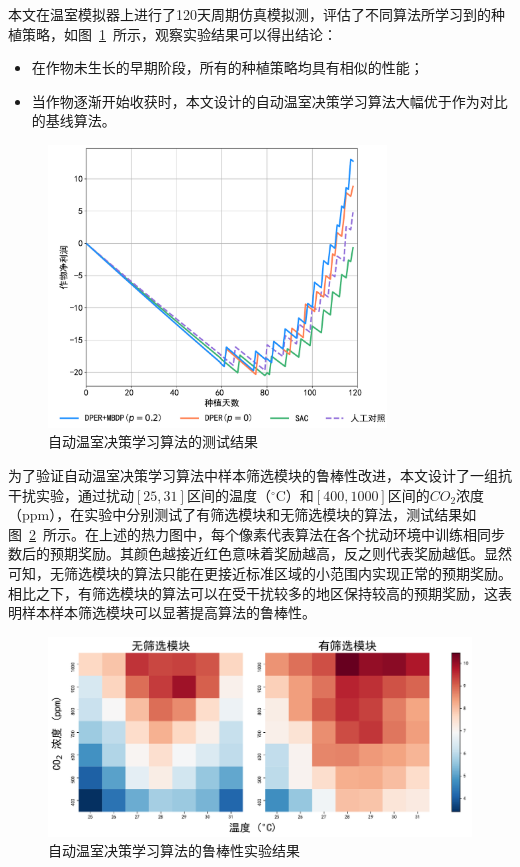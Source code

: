本文在温室模拟器上进行了120天周期仿真模拟测，评估了不同算法所学习到的种植策略，如图~\ref{fig:acml-test}~所示，观察实验结果可以得出结论：

\begin{itemize}
    \item 在作物未生长的早期阶段，所有的种植策略均具有相似的性能；
    \item 当作物逐渐开始收获时，本文设计的自动温室决策学习算法大幅优于作为对比的基线算法。
\end{itemize}

\begin{figure}[ht]
\centering
\includegraphics[width=0.8\textwidth]{figures/acml-test.pdf}
\caption{自动温室决策学习算法的测试结果}
\label{fig:acml-test}
\end{figure}

为了验证自动温室决策学习算法中样本筛选模块的鲁棒性改进，本文设计了一组抗干扰实验，通过扰动$[25, 31]$区间的温度（$^\circ$C）和$[400, 1000]$区间的$CO_2$浓度（ppm），在实验中分别测试了有筛选模块和无筛选模块的算法，测试结果如图~\ref{fig:robustness}~所示。在上述的热力图中，每个像素代表算法在各个扰动环境中训练相同步数后的预期奖励。其颜色越接近红色意味着奖励越高，反之则代表奖励越低。显然可知，无筛选模块的算法只能在更接近标准区域的小范围内实现正常的预期奖励。相比之下，有筛选模块的算法可以在受干扰较多的地区保持较高的预期奖励，这表明样本样本筛选模块可以显著提高算法的鲁棒性。

\begin{figure}[ht]
\centering
\includegraphics[width=\textwidth]{figures/robustness-heatmap-for-iros.pdf}
\caption{自动温室决策学习算法的鲁棒性实验结果}
\label{fig:robustness}
\end{figure}

